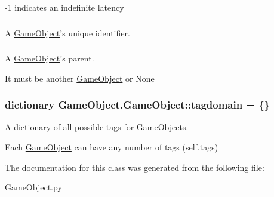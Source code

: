 -\/1 indicates an indefinite latency \hypertarget{classGameObject_1_1GameObject_ac9ae5ed4d040061ff584751e20799a7a}{
\subsubsection[{objid}]{}}\label{classGameObject_1_1GameObject_ac9ae5ed4d040061ff584751e20799a7a}


\-A \hyperlink{classGameObject_1_1GameObject}{\-Game\-Object}'s unique identifier. 

\hypertarget{classGameObject_1_1GameObject_aa496066be50cb5918bc7cbf56d14cf7a}{
\subsubsection[{parent}]{}}\label{classGameObject_1_1GameObject_aa496066be50cb5918bc7cbf56d14cf7a}


\-A \hyperlink{classGameObject_1_1GameObject}{\-Game\-Object}'s parent. 

\-It must be another \hyperlink{classGameObject_1_1GameObject}{\-Game\-Object} or \-None \hypertarget{classGameObject_1_1GameObject_a437572cf73cf761ce7c4e38472bd7015}{
\subsubsection[{tagdomain}]{\setlength{\rightskip}{0pt plus 5cm}dictionary {\bf \-Game\-Object.\-Game\-Object\-::tagdomain} = \{\}}}\label{classGameObject_1_1GameObject_a437572cf73cf761ce7c4e38472bd7015}


\-A dictionary of all possible tags for \-Game\-Objects. 

\-Each \hyperlink{classGameObject_1_1GameObject}{\-Game\-Object} can have any number of tags (self.\-tags) 

\-The documentation for this class was generated from the following file\-:\begin{DoxyCompactItemize}
\item 
\-Game\-Object.\-py\end{DoxyCompactItemize}
